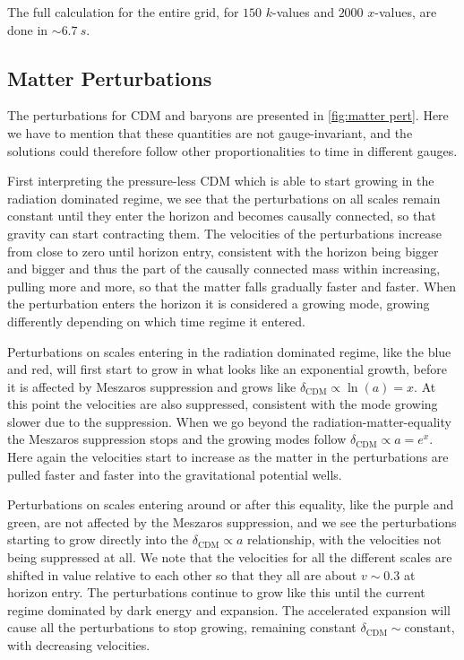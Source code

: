 \documentclass[10pt,a4paper]{article}
\providecommand{\rCDM}
{\ensuremath{
\textrm{CDM}
}
}
\begin{document}
The full calculation for the entire grid, for $150$ $k$-values and $2000$ $x$-values, are done in $\sim \SI{6.7}{s}$.

\subsection{Matter Perturbations}
\label{subsec:Results/Matter pert}
The perturbations for \rCDM and baryons are presented in \cref{fig:matter pert}. Here we have to mention that these quantities are not gauge-invariant, and the solutions could therefore follow other proportionalities to time in different gauges.

First interpreting the pressure-less \rCDM which is able to start growing in the radiation dominated regime, we see that the perturbations on all scales remain constant until they enter the horizon and becomes causally connected, so that gravity can start contracting them. The velocities of the perturbations increase from close to zero until horizon entry, consistent with the horizon being bigger and bigger and thus the part of the causally connected mass within increasing, pulling more and more, so that the matter falls gradually faster and faster. When the perturbation enters the horizon it is considered a growing mode, growing differently depending on which time regime it entered.

Perturbations on scales entering in the radiation dominated regime, like the blue and red, will first start to grow in what looks like an exponential growth, before it is affected by Meszaros suppression and grows like $\delta_{\rCDM} \propto \ln(a) = x$. At this point the velocities are also suppressed, consistent with the mode growing slower due to the suppression. When we go beyond the radiation-matter-equality the Meszaros suppression stops and the growing modes follow $\delta_{\rCDM} \propto a = e^x$. Here again the velocities start to increase as the matter in the perturbations are pulled faster and faster into the gravitational potential wells.

Perturbations on scales entering around or after this equality, like the purple and green, are not affected by the Meszaros suppression, and we see the perturbations starting to grow directly into the $\delta_{\rCDM} \propto a$ relationship, with the velocities not being suppressed at all. We note that the velocities for all the different scales are shifted in value relative to each other so that they all are about $v \sim 0.3$ at horizon entry. The perturbations continue to grow like this until the current regime dominated by dark energy and expansion. The accelerated expansion will cause all the perturbations to stop growing, remaining constant $\delta_{\rCDM} \sim \textrm{constant}$, with decreasing velocities.
\end{document}
